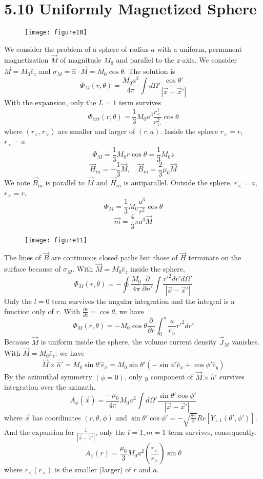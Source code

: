 \documentclass{article}
\begin{document}
	\section*{5.10 Uniformly Magnetized Sphere}
	
	\begin{figure}[h]
		\centering
		\texttt{[image: figure10]}
		\caption{}
		\label{fig:figure10}
	\end{figure}
	
	
	We consider the problem of a sphere of radius $a$ with a uniform, permanent magnetization $\vec{M}$ of magnitude $M_0$ and parallel to the z-axis.
	We consider $\vec{M} = M_0 \hat{e}_z$ and $\sigma_M = \hat{n} \cdot \vec{M} = M_0 \cos\theta$.
	The solution is
	$$ \Phi_M(r, \theta) = \frac{M_0 a^2}{4\pi} \int d\Omega' \frac{\cos\theta'}{|\vec{x}-\vec{x}'|} $$
	With the expansion, only the $L=1$ term survives
	$$ \Phi_{ext}(r, \theta) = \frac{1}{3} M_0 a^3 \frac{r_<^1}{r_>^{2}} \cos\theta $$
	where $(r_<, r_>)$ are smaller and larger of $(r, a)$.
	Inside the sphere $r_<=r$, $r_>=a$.
	$$ \Phi_M = \frac{1}{3} M_0 r \cos\theta = \frac{1}{3} M_0 z $$
	$$ \vec{H}_{in} = -\frac{1}{3}\vec{M}, \quad \vec{B}_{in} = \frac{2}{3}\mu_0 \vec{M} $$
	We note $\vec{B}_{in}$ is parallel to $\vec{M}$ and $\vec{H}_{in}$ is antiparallel.
	Outside the sphere, $r_<=a$, $r_>=r$.
	$$ \Phi_M = \frac{1}{3} M_0 \frac{a^3}{r^2} \cos\theta $$
	$$ \vec{m} = \frac{4}{3}\pi a^3 \vec{M} $$
	
	\begin{figure}[h]
		\centering
		\texttt{[image: figure11]}
		\caption{}
		\label{fig:figure11}
	\end{figure}
	
	The lines of $\vec{B}$ are continuous closed paths but those of $\vec{H}$ terminate on the surface because of $\sigma_M$.
	With $\vec{M} = M_0 \hat{e}_z$ inside the sphere,
	$$ \Phi_M(r, \theta) = - \oint \frac{M_0}{4\pi} \frac{\partial}{\partial n'} \int \frac{r'^2 dr' d\Omega'}{|\vec{x}-\vec{x}'|} $$
	Only the $l=0$ term survives the angular integration and the integral is a function only of $r$.
	With $\frac{\partial r}{\partial z} = \cos\theta$, we have
	$$ \Phi_M(r, \theta) = - M_0 \cos\theta \frac{\partial}{\partial r} \int_0^a \frac{a}{r_>} r'^2 dr' $$
	Because $\vec{M}$ is uniform inside the sphere, the volume current density $\vec{J}_M$ vanishes.
	With $\vec{M} = M_0 \hat{e}_z$: we have
	$$ \vec{M} \times \hat{n}' = M_0 \sin\theta' \hat{e}_\phi = M_0 \sin\theta' (-\sin\phi' \hat{e}_x + \cos\phi' \hat{e}_y) $$
	By the azimuthal symmetry $(\phi=0)$, only $y$ component of $\vec{M} \times \hat{n}'$ survives integration over the azimuth.
	$$ A_\phi(\vec{x}) = \frac{-\mu_0}{4\pi} M_0 a^2 \int d\Omega' \frac{\sin\theta' \cos\phi'}{|\vec{x}-\vec{x}'|} $$
	where $\vec{x}$ has coordinates $(r, \theta, \phi)$ and $\sin\theta' \cos\phi' = -\sqrt{\frac{8\pi}{3}} Re[Y_{1,1}(\theta', \phi')]$.
	And the expansion for $\frac{1}{|\vec{x}-\vec{x}'|}$, only the $l=1, m=1$ term survives, consequently.
	$$ A_\phi(r) = \frac{\mu_0}{3} M_0 a^2 (\frac{r_<}{r_>}) \sin\theta $$
	where $r_<(r_>)$ is the smaller (larger) of $r$ and $a$.
	
\end{document}
